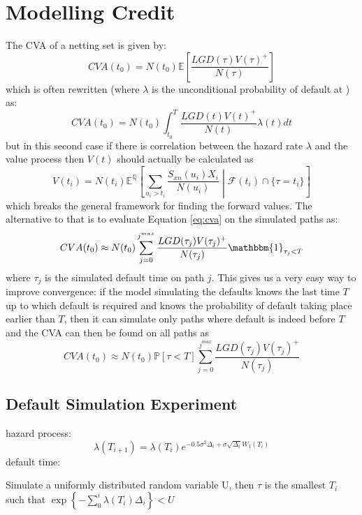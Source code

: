 \documentclass[a4paper,10pt]{article}
\newcommand{\E}{\mathbb{E}}                 %
\renewcommand{\P}{\mathbb{P}}               %
\newcommand{\Q}{\mathbb{Q}}                 %
\begin{document}
\section{Modelling Credit}
The CVA of a netting set is given by:
\begin{equation}
CVA(t_0) = N(t_0) \E \left[ \frac{LGD(\tau)V(\tau)^+}{N(\tau)}\right]
\label{eq:cva}
\end{equation}
which is often rewritten (where $\lambda$ is the unconditional probability of default at ) as:
\begin{equation}
CVA(t_0) = N(t_0) \int_{t_0}^T \frac{LGD(t)V(t)^+}{N(t)} \lambda(t) dt
\end{equation}
but in this second case if there is correlation between the hazard rate $\lambda$ and the value process then $V(t)$
should actually be calculated as 
\begin{equation}
V(t_i) = N(t_i)\E^\Q\left[ \sum_{u_i>t_i}{\frac{S_{xn}(u_i)X_i}{N(u_i)}} \middle| \mathcal{F}(t_i) \cap \{\tau=t_i\} \right]
\end{equation}
which breaks the general framework for finding the forward values.  The alternative to that is to evaluate Equation \ref{eq:cva} on the simulated paths as:
\begin{equation}
CVA(t_0) \approx N(t_0) \sum_{j=0}^{j^{max}} \frac{LGD(\tau_j)V(\tau_j)^+}{N(\tau_j)} \mathbbm{1}_{\tau_j<T}\\
\label{eq:cva2}
\end{equation}
where $\tau_j$ is the simulated default time on path $j$.  This gives us a very easy way to improve convergence: if the model simulating the defaults knows the last time $T$ up to which default is required and knows the probability of default taking place earlier than $T$, then it can simulate only paths where default is indeed before $T$ and the CVA can then be found on all paths as
\begin{equation}
CVA(t_0) \approx N(t_0) \P[\tau<T] \sum_{j=0}^{j^{max}} \frac{LGD(\tau_j)V(\tau_j)^+}{N(\tau_j)} 
\label{eq:cva3}
\end{equation}

\subsection{Default Simulation Experiment}
hazard process:
\[\lambda(T_{i+1}) = \lambda(T_i) e ^ {-0.5 \sigma^2 \Delta_i + \sigma \sqrt{\Delta_i} W_1(T_i)}  \]
default time:

Simulate a uniformly distributed random variable U, then $\tau$ is the smallest $T_i$ such that 
$\exp{ \left\{ -\sum_0^i \lambda(T_i) \Delta_i \right\} < U }$ 
\end{document}
